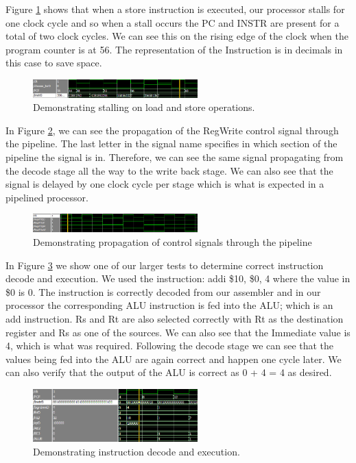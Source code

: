 \documentclass[conference]{IEEEtran}
\begin{document}
Figure \ref{stall} shows that when a store instruction is executed, our processor stalls for one clock cycle and so when a stall occurs the PC and INSTR are present for a total of two clock cycles. We can see this on the rising edge of the clock when the program counter is at 56. The representation of the Instruction is in decimals in this case to save space.

\begin{figure}[!h]
\centering
\includegraphics[width=2.5in]{Figures/stall}
\caption{Demonstrating stalling on load and store operations.}
\label{stall}
\end{figure}

In Figure \ref{pipeProp}, we can see the propagation of the RegWrite control signal through the pipeline. The last letter in the signal name specifies in which section of the pipeline the signal is in. Therefore, we can see the same signal propagating from the decode stage all the way to the write back stage. We can also see that the signal is delayed by one clock cycle per stage which is what is expected in a pipelined processor.

\begin{figure}[!h]
\centering
\includegraphics[width=2.5in]{Figures/pipeline_prop}
\caption{Demonstrating propagation of control signals through the pipeline}
\label{pipeProp}
\end{figure}

In Figure \ref{instDecEx} we show one of our larger tests to determine correct instruction decode and execution. We used the instruction: addi \$10, \$0, 4 where the value in \$0 is 0. The instruction is correctly decoded from our assembler and in our processor the corresponding ALU instruction is fed into the ALU; which is an add instruction. Rs and Rt are also selected correctly with Rt as the destination register and Rs as one of the sources. We can also see that the Immediate value is 4, which is what was required. Following the decode stage we can see that the values being fed into the ALU are again correct and happen one cycle later. We can also verify that the output of the ALU is correct as 0 + 4 = 4 as desired.

\begin{figure}[!h]
\centering
\includegraphics[width=2.5in]{Figures/instr_decode_execute}
\caption{Demonstrating instruction decode and execution.}
\label{instDecEx}
\end{figure}
\end{document}
